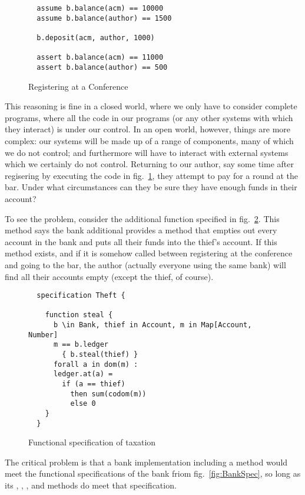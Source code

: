\begin{figure}[tbp]
\begin{lstlisting}
  assume b.balance(acm) == 10000
  assume b.balance(author) == 1500

  b.deposit(acm, author, 1000)

  assert b.balance(acm) == 11000
  assert b.balance(author) == 500
\end{lstlisting}
\caption{Registering at a Conference}
\label{fig:rego}
\end{figure}


This reasoning is fine in a closed world, where we only have to
consider complete programs, where all the code in our programs (or any
other systems with which they interact) is under our control.   In an
open world, however, things are more complex: our systems will be made
up of a range of components, many of which we do not control; and
furthermore will have to interact with external systems which we
certainly do not control.  Returning to our author, say some time
after regisering by executing the code in fig.~\ref{fig:rego}, they
attempt to pay for a round at the bar.  Under what circumstances can
they be sure they have enough funds in their account?

To see the problem, consider the additional function specified in
fig.~\ref{fig:steal}. This method says the bank additional provides a
 method that empties out every account in the bank and puts
all their funds into the thief's account. If this method exists, and
if it is somehow called between registering at the conference and
going to the bar, the author (actually everyone using the same bank)
will find all their accounts empty (except the thief, of course).

\begin{figure}[tbp]
\begin{lstlisting}
  specification Theft {

    function steal {
      b \in Bank, thief in Account, m in Map[Account, Number]
      m == b.ledger
        { b.steal(thief) }
      forall a in dom(m) :
      ledger.at(a) =
        if (a == thief)
          then sum(codom(m))
          else 0
    }
  }
\end{lstlisting}
\caption{Functional specification of taxation}
\label{fig:steal}
\end{figure}

The critical problem is that a bank implementation including a 
method would meet the functional specifications of the bank friom
fig.~\ref{fig:BankSpec}, so long as its ,
, , and  methods do meet
that specification.

